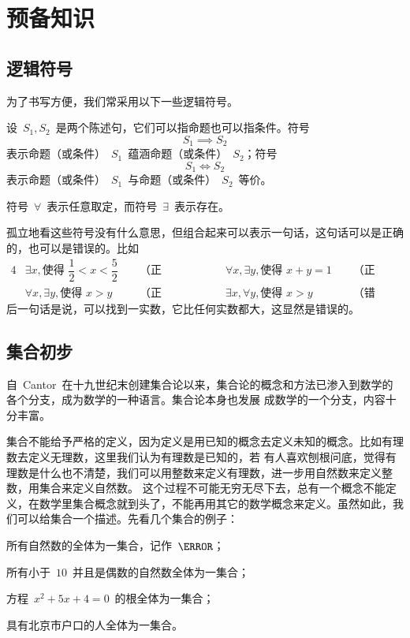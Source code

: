 

\chapter{预备知识}\label{ch:0}

\section{逻辑符号}

为了书写方便，我们常采用以下一些逻辑符号。

设~$S_1,S_2$~是两个陈述句，它们可以指命题也可以指条件。符号
\[
  S_1\implies S_2
\]
表示命题（或条件）~$S_1$~蕴涵命题（或条件）~$S_2$；符号
\[
  S_1\iff S_2
\]
表示命题（或条件）~$S_1$~与命题（或条件）~$S_2$~等价。

符号~$\forall$~表示任意取定，而符号~$\exists$~表示存在。

孤立地看这些符号没有什么意思，但组合起来可以表示一句话，这句话可以是正确的，也可以是错误的。比如
\begin{alignat*}{4}
&\exists x,\text{使得~}\dfrac 12<x<\dfrac 52 &\enspace&\text{（正确）；}
&\qquad&\forall x,\exists y,\text{使得~}x+y=1 &\enspace&\text{（正确）；}\\
&\forall x,\exists y,\text{使得~}x>y & &\text{（正确）；}
&\qquad&\exists x,\forall y,\text{使得~}x>y & &\text{（错误）。}
\end{alignat*}
后一句话是说，可以找到一实数，它比任何实数都大，这显然是错误的。

\section{集合初步}

自~Cantor~在十九世纪末创建集合论以来，集合论的概念和方法已渗入到数学的各个分支，成为数学的一种语言。集合论本身也发展
成数学的一个分支，内容十分丰富。

集合不能给予严格的定义，因为定义是用已知的概念去定义未知的概念。比如有理数去定义无理数，这里我们认为有理数是已知的，若
有人喜欢刨根问底，觉得有理数是什么也不清楚，我们可以用整数来定义有理数，进一步用自然数来定义整数，用集合来定义自然数。%
这个过程不可能无穷无尽下去，总有一个概念不能定义，在数学里集合概念就到头了，不能再用其它的数学概念来定义。虽然如此，我
们可以给集合一个描述。先看几个集合的例子：

\begin{enumlist}
\item 所有自然数的全体为一集合，记作~$\mN$；\label{enum:set1}
\item 所有小于~$10$~并且是偶数的自然数全体为一集合；\label{enum:set2}
\item 方程~$x^2+5x+4=0$~的根全体为一集合；\label{enum:set3}
\item 具有北京市户口的人全体为一集合。\label{enum:set4}
\end{enumlist}

